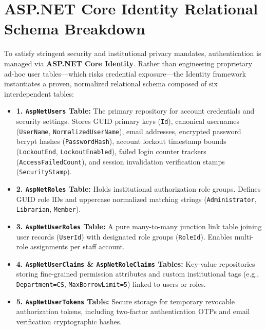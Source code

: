 \documentclass[11pt,a4paper]{report}
\begin{document}
\section{ASP.NET Core Identity Relational Schema Breakdown}
To satisfy stringent security and institutional privacy mandates, authentication is managed via \textbf{ASP.NET Core Identity}. Rather than engineering proprietary ad-hoc user tables---which risks credential exposure---the Identity framework instantiates a proven, normalized relational schema composed of six interdependent tables:
\begin{itemize}[leftmargin=1.5em]
    \item \textbf{1. \texttt{AspNetUsers} Table:} The primary repository for account credentials and security settings. Stores GUID primary keys (\texttt{Id}), canonical usernames (\texttt{UserName}, \texttt{NormalizedUserName}), email addresses, encrypted password bcrypt hashes (\texttt{PasswordHash}), account lockout timestamp bounds (\texttt{LockoutEnd}, \texttt{LockoutEnabled}), failed login counter trackers (\texttt{AccessFailedCount}), and session invalidation verification stamps (\texttt{SecurityStamp}).
    \item \textbf{2. \texttt{AspNetRoles} Table:} Holds institutional authorization role groups. Defines GUID role IDs and uppercase normalized matching strings (\texttt{Administrator}, \texttt{Librarian}, \texttt{Member}).
    \item \textbf{3. \texttt{AspNetUserRoles} Table:} A pure many-to-many junction link table joining user records (\texttt{UserId}) with designated role groups (\texttt{RoleId}). Enables multi-role assignments per staff account.
    \item \textbf{4. \texttt{AspNetUserClaims} \& \texttt{AspNetRoleClaims} Tables:} Key-value repositories storing fine-grained permission attributes and custom institutional tags (e.g., \texttt{Department=CS}, \texttt{MaxBorrowLimit=5}) linked to users or roles.
    \item \textbf{5. \texttt{AspNetUserTokens} Table:} Secure storage for temporary revocable authorization tokens, including two-factor authentication OTPs and email verification cryptographic hashes.
\end{itemize}
\end{document}
